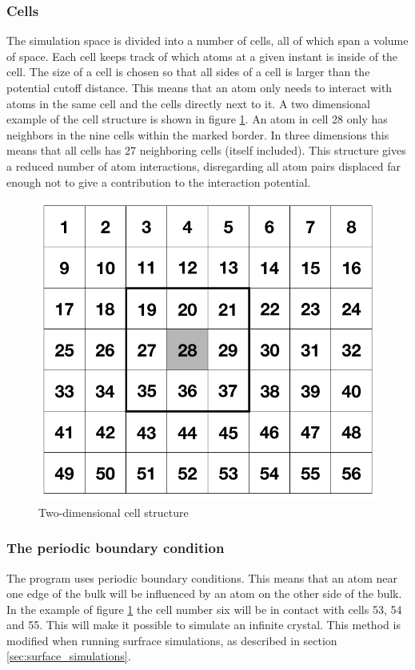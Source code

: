 \documentclass[12pt,a4paper]{article}
\begin{document}
\subsubsection{Cells}
\label{sec:cells}
The simulation space is divided into a number of cells, all of which span a volume of space. Each cell keeps track of which atoms at a given instant is inside of the cell. The size of a cell is chosen so that all sides of a cell is larger than the potential cutoff distance. This means that an atom only needs to interact with atoms in the same cell and the cells directly next to it. A two dimensional example of the cell structure is shown in figure \ref{fig:cells}. An atom in cell 28 only has neighbors in the nine cells within the marked border. In three dimensions this means that all cells has 27 neighboring cells (itself included). This structure gives a reduced number of atom interactions, disregarding all atom pairs displaced far enough not to give a contribution to the interaction potential. 

\begin{figure}[h]
\begin{center}
\includegraphics[scale=0.4]{figs/cells.png}
\caption{\small Two-dimensional cell structure
\label{fig:cells}}
\end{center}
\end{figure}


\subsubsection{The periodic boundary condition}
\label{sec:the_periodic_boundary_condition}
The program uses periodic boundary conditions. This means that an atom near one edge of the bulk will be influenced by an atom on the other side of the bulk. In the example of figure \ref{fig:cells} the cell number six will be in contact with cells 53, 54 and 55. This will make it possible to simulate an infinite crystal. This method is modified when running surfrace simulations, as described in section \ref{sec:surface_simulations}.
\end{document}
